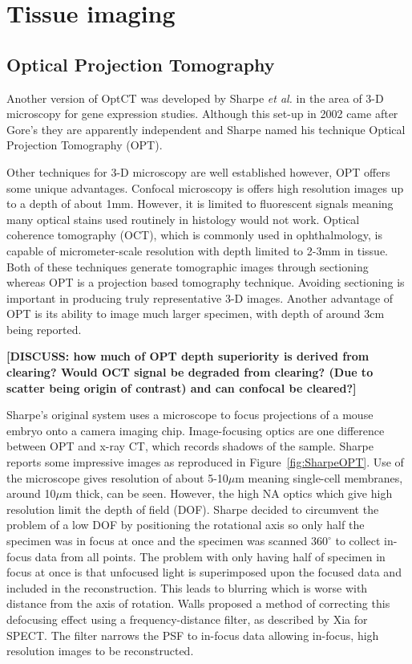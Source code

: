 \documentclass[12pt]{article}
\begin{document}
\newpage
\section{Tissue imaging}
\subsection{Optical Projection Tomography}

Another version of OptCT was  developed by Sharpe \textit{et al.} in the area of 3-D microscopy for gene expression studies. \cite{Sharpe:2002jp} Although this set-up in 2002 came after Gore's they are apparently independent and Sharpe named his technique Optical Projection Tomography (OPT).

Other techniques for 3-D microscopy are well established however, OPT offers some unique advantages. 
Confocal microscopy is offers high resolution images up to a depth of about 1mm. \cite{Webb:1996} However, it is limited to fluorescent signals meaning many optical stains used routinely in histology would not work. Optical coherence tomography (OCT), which is commonly used in ophthalmology, is capable of micrometer-scale resolution with  depth limited to 2-3mm in tissue. \cite{huang1993optical} Both of these techniques generate tomographic images through sectioning whereas OPT is a projection based tomography technique. \cite{Sharpe:2003cm} Avoiding sectioning is important in producing truly representative 3-D images. \cite{Oldham:2007ku} Another advantage of  OPT is its ability to  image much larger specimen, with depth of around 3cm being reported. \cite{Oldham:2007ku} 

\textbf{[DISCUSS: how much of OPT depth superiority is derived from clearing? Would OCT signal be degraded from clearing? (Due to scatter being origin of contrast) and can confocal be cleared?]}

Sharpe's original system uses a microscope to focus projections of a mouse embryo onto a camera imaging chip. Image-focusing optics are one difference between OPT and x-ray CT, which records shadows of the sample. \cite{Sharpe:2002jp} Sharpe reports some impressive images as reproduced in Figure~\ref{fig:SharpeOPT}. Use of the microscope gives resolution of about 5-10$\mu$m meaning single-cell membranes, around 10$\mu$m thick, can be seen.\cite{Sharpe:2002jp} However, the high NA  optics which give high resolution limit the depth of field (DOF). Sharpe decided to circumvent the problem of a low DOF by positioning the rotational axis so only half the specimen was in focus at once and the specimen was scanned $360^{\circ}$ to collect in-focus data from all points. The problem with only having half of specimen in focus at once is that unfocused light is superimposed upon the focused data and included in the reconstruction. This leads to blurring which is worse with distance from the axis of rotation. Walls proposed a method of correcting this defocusing effect using a frequency-distance filter, as described by Xia for SPECT. \cite{xia1995fourier,Walls:2007jl} The filter narrows the PSF to in-focus data allowing in-focus, high resolution images to be reconstructed. \cite{Walls:2007jl}
\end{document}

